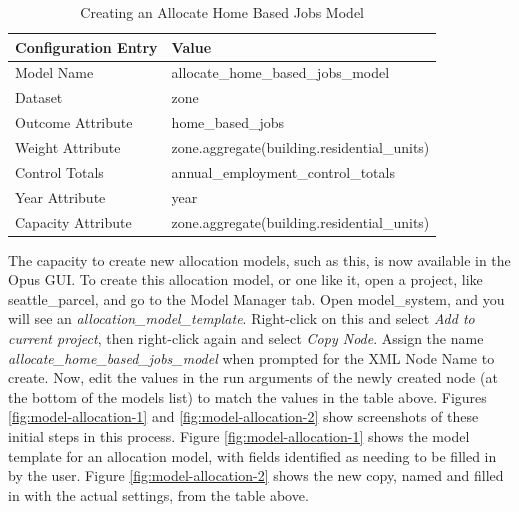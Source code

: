 \begin{table}[htp]
\caption{Creating an Allocate Home Based Jobs Model}
\label{tab:allocation-model}
\begin{center}
\begin{tabular}{ p{1.5in}  p{4.4in}  }
\toprule[1.5pt]
Configuration Entry & Value \\
\midrule
Model Name & allocate\_home\_based\_jobs\_model \\
Dataset & zone \\
Outcome Attribute & home\_based\_jobs \\
Weight Attribute & zone.aggregate(building.residential\_units) \\
Control Totals & annual\_employment\_control\_totals \\
Year Attribute & year \\
Capacity Attribute & zone.aggregate(building.residential\_units) \\
\bottomrule
\end{tabular}
\end{center}
\end{table}

The capacity to create new allocation models, such as this, is now available in the Opus GUI.  To create this allocation model, or one like it, open a project, like seattle\_parcel, and go to the Model Manager tab.  Open model\_system, and you will see an \emph{allocation\_model\_template}.  Right-click on this and select \emph{Add to current project}, then right-click again and select \emph{Copy Node}.  Assign the name \emph{allocate\_home\_based\_jobs\_model} when prompted for the XML Node Name to create.  Now, edit the values in the run arguments of the newly created node (at the bottom of the models list) to match the values in the table above. Figures \ref{fig:model-allocation-1} and \ref{fig:model-allocation-2} show screenshots of these initial steps in this process.  Figure \ref{fig:model-allocation-1} shows the model template for an allocation model, with fields identified as needing to be filled in by the user. Figure \ref{fig:model-allocation-2} shows the new copy, named and filled in with the actual settings, from the table above. 

